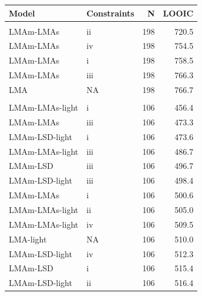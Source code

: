 \documentclass[
  12pt,
  letterpaper,
  DIV=11,
  numbers=noendperiod]{scrartcl}
\begin{document}
\begin{table}
\centering
\begin{tabular}{llrr}
\toprule
Model & Constraints & N & LOOIC\\
\midrule
\addlinespace[0.3em]
\multicolumn{4}{l}{\textbf{GLOPNET}}\\
\hspace{1em}LMAm-LMAs & ii & 198 & 720.5\\
\hspace{1em}LMAm-LMAs & iv & 198 & 754.5\\
\hspace{1em}LMAm-LMAs & i & 198 & 758.5\\
\hspace{1em}LMAm-LMAs & iii & 198 & 766.3\\
\hspace{1em}LMA & NA & 198 & 766.7\\
\addlinespace[0.3em]
\multicolumn{4}{l}{\textbf{Panama}}\\
\hspace{1em}LMAm-LMAs-light & i & 106 & 456.4\\
\hspace{1em}LMAm-LMAs & iii & 106 & 473.3\\
\hspace{1em}LMAm-LSD-light & i & 106 & 473.6\\
\hspace{1em}LMAm-LMAs-light & iii & 106 & 486.7\\
\hspace{1em}LMAm-LSD & iii & 106 & 496.7\\
\hspace{1em}LMAm-LSD-light & iii & 106 & 498.4\\
\hspace{1em}LMAm-LMAs & i & 106 & 500.6\\
\hspace{1em}LMAm-LMAs-light & ii & 106 & 505.0\\
\hspace{1em}LMAm-LMAs-light & iv & 106 & 509.5\\
\hspace{1em}LMA-light & NA & 106 & 510.0\\
\hspace{1em}LMAm-LSD-light & iv & 106 & 512.3\\
\hspace{1em}LMAm-LSD & i & 106 & 515.4\\
\hspace{1em}LMAm-LSD-light & ii & 106 & 516.4\\

\end{tabular}
\end{table}
\end{document}
